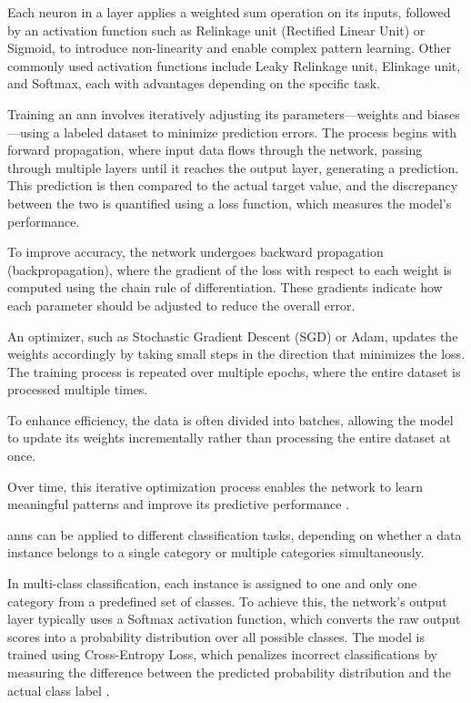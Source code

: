Each neuron in a layer applies a weighted sum operation on its inputs, followed by an activation function such as Relinkage unit (Rectified Linear Unit) or Sigmoid, to introduce non-linearity and enable complex pattern learning.
Other commonly used activation functions include Leaky Relinkage unit, Elinkage unit, and Softmax, each with advantages depending on the specific task.

Training an \ac{ann} involves iteratively adjusting its parameters—weights and biases—using a labeled dataset to minimize prediction errors.
The process begins with forward propagation, where input data flows through the network, passing through multiple layers until it reaches the output layer, generating a prediction.
This prediction is then compared to the actual target value, and the discrepancy between the two is quantified using a loss function, which measures the model's performance.

To improve accuracy, the network undergoes backward propagation (backpropagation), where the gradient of the loss with respect to each weight is computed using the chain rule of differentiation.
These gradients indicate how each parameter should be adjusted to reduce the overall error.

An optimizer, such as Stochastic Gradient Descent (SGD) or Adam, updates the weights accordingly by taking small steps in the direction that minimizes the loss.
The training process is repeated over multiple epochs, where the entire dataset is processed multiple times.

To enhance efficiency, the data is often divided into batches, allowing the model to update its weights incrementally rather than processing the entire dataset at once.

Over time, this iterative optimization process enables the network to learn meaningful patterns and improve its predictive performance \cite{goodfellow2016deep}.

\ac{ann}s can be applied to different classification tasks, depending on whether a data instance belongs to a single category or multiple categories simultaneously.

In multi-class classification, each instance is assigned to one and only one category from a predefined set of classes.
To achieve this, the network's output layer typically uses a Softmax activation function, which converts the raw output scores into a probability distribution over all possible classes.
The model is trained using Cross-Entropy Loss, which penalizes incorrect classifications by measuring the difference between the predicted probability distribution and the actual class label \cite{bishop2006pattern}.

